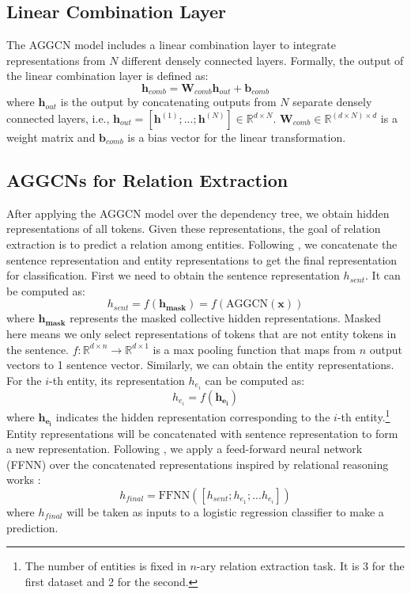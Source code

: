 \documentclass[11pt,a4paper]{article}
\begin{document}
\subsection{Linear Combination Layer}
\label{ssec:2.4}

The AGGCN model includes a linear combination layer to integrate representations from $N$ different densely connected layers. Formally, the output of the linear combination layer is defined as:
\begin{equation}
\mathbf{h}_{comb} = \mathbf{W}_{comb}\mathbf{h}_{out} + \mathbf{b}_{comb}
\end{equation}
where $\mathbf{h}_{out}$ is the output by concatenating outputs from $N$ separate densely connected layers, i.e., $\mathbf{h}_{out} = [\mathbf{h}^{(1)}; ... ;\mathbf{h}^{(N)}] \in \mathbb{R}^{d \times N}$. $\mathbf{W}_{comb} \in \mathbb{R}^{(d \times N) \times d}$ is a weight matrix and $\mathbf{b}_{comb}$ is a bias vector for the linear transformation.  


\subsection{AGGCNs for Relation Extraction}
\label{ssec:2.5}

After applying the AGGCN model over the dependency tree, we obtain hidden representations of all tokens. Given these representations, the goal of relation extraction is to predict a relation among entities. Following \citep{Zhang2018GraphCO}, we concatenate the sentence representation and entity representations to get the final representation for classification. First we need to obtain the sentence representation $h_{sent}$. It can be computed as:
\begin{equation}
h_{sent} = f(\mathbf{h_{mask}}) = f(\text{AGGCN}(\mathbf{x}))
\end{equation}
where $\mathbf{h_{mask}}$ represents the masked collective hidden representations. 
Masked here means we only select representations
of tokens that are not entity tokens in the sentence. $f: \mathbb{R}^{d \times n} \rightarrow \mathbb{R}^{d \times 1}$ is a max pooling function that maps from $n$ output vectors to 1 sentence vector. Similarly, we can obtain the entity representations. For the $i$-th entity, its representation $h_{e_{i}}$ can be computed as:
\begin{equation}
h_{e_{i}} = f(\mathbf{h_{e_{i}}})
\end{equation}
where $\mathbf{h_{e_{i}}}$ indicates the hidden representation corresponding to the $i$-th entity.\footnote{The number of entities is fixed in $n$-ary relation extraction task. It is 3 for the first dataset and 2 for the second.} Entity representations will be concatenated with sentence representation to form a new representation. Following \citep{Zhang2018GraphCO}, we apply a feed-forward neural network (FFNN) over the concatenated representations inspired by relational reasoning works \citep{Santoro2017ASN, Lee2017EndtoendNC}:
\begin{equation}
h_{final} = \text{FFNN}([h_{sent};h_{e_{1}};...h_{e_{i}}])
\end{equation}
where $h_{final}$ will be taken as inputs to a logistic regression classifier to make a prediction.
\end{document}
